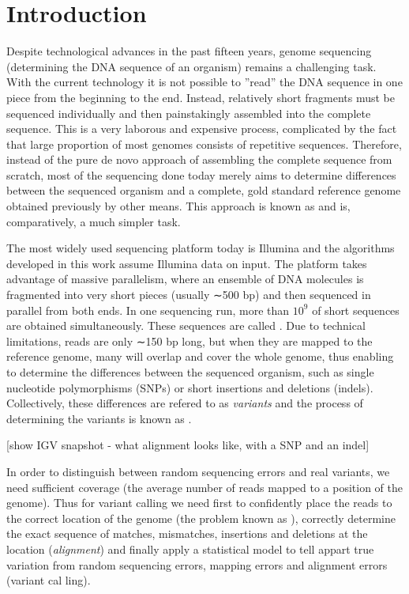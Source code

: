 \chapter{Introduction}
\label{chap:introduction}

Despite technological advances in the past fifteen years, genome sequencing (determining the DNA sequence of an organism) remains a challenging task. With the current technology it is not possible to ”read” the DNA sequence in one
piece from the beginning to the end. Instead, relatively short fragments must
be sequenced individually and then painstakingly assembled into the complete
sequence. This is a very laborous and expensive process, complicated by the fact
that large proportion of most genomes consists of repetitive sequences. Therefore,
instead of the pure de novo approach of assembling the complete sequence from
scratch, most of the sequencing done today merely aims to determine differences
between the sequenced organism and a complete, gold standard reference genome obtained previously by other means. This approach is known as  and is, comparatively, a much simpler task.

The most widely used sequencing platform today is Illumina and the algorithms developed in this work assume Illumina data on input. The platform takes advantage of massive parallelism, where an ensemble of DNA molecules is fragmented into very short pieces (usually ∼500 bp) and then sequenced in parallel from both ends. In one sequencing run, more than $10^9$ of short sequences are obtained simultaneously. These sequences are called . Due to technical limitations, reads are only ∼150 bp long, but when they are mapped to the reference genome, many will overlap and cover the whole genome, thus enabling to determine the differences between the sequenced organism, such as single nucleotide polymorphisms (SNPs) or short insertions and deletions (indels). Collectively, these differences are refered to as \textit{variants} and the process of determining the variants is known as .

[show IGV snapshot - what alignment looks like, with a SNP and an indel]

In order to distinguish between random sequencing errors and real variants, we need sufficient coverage (the average number of reads mapped to a position of
the genome). Thus for variant calling we need first to confidently place the reads
to the correct location of the genome (the problem known as ), correctly determine the exact sequence of matches, mismatches, insertions and deletions at the location (\textit{alignment}) and finally apply a statistical model to tell appart true variation from random sequencing errors, mapping errors and alignment errors (variant cal ling).

